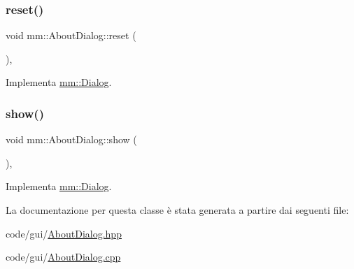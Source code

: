 \mbox{\label{classmm_1_1_about_dialog_a21f5b0a7c9d8e43baab78e073d7ade2b}} 
\subsubsection{\texorpdfstring{reset()}{reset()}}
{\footnotesize\ttfamily void mm\+::\+About\+Dialog\+::reset (\begin{DoxyParamCaption}{ }\end{DoxyParamCaption})\hspace{0.3cm}{\ttfamily [override]}, {\ttfamily [virtual]}}



Implementa \hyperlink{classmm_1_1_dialog_abe6e5ac072c12c06971f60491f079d80}{mm\+::\+Dialog}.

\mbox{\label{classmm_1_1_about_dialog_a9e06dc12f6950b74ccf6ccece693f108}} 
\subsubsection{\texorpdfstring{show()}{show()}}
{\footnotesize\ttfamily void mm\+::\+About\+Dialog\+::show (\begin{DoxyParamCaption}{ }\end{DoxyParamCaption})\hspace{0.3cm}{\ttfamily [override]}, {\ttfamily [virtual]}}



Implementa \hyperlink{classmm_1_1_dialog_afda4b0dc7c0ac027c4b8fdb95713700f}{mm\+::\+Dialog}.



La documentazione per questa classe è stata generata a partire dai seguenti file\+:\begin{DoxyCompactItemize}
\item 
code/gui/\hyperlink{_about_dialog_8hpp}{About\+Dialog.\+hpp}\item 
code/gui/\hyperlink{_about_dialog_8cpp}{About\+Dialog.\+cpp}\end{DoxyCompactItemize}
